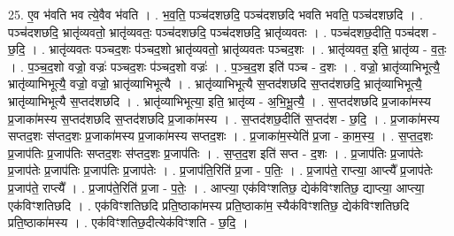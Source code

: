 \documentclass[17pt]{extarticle}
\begin{document}
25. ए॒व भ॑वति भव त्ये॒वैव भ॑वति । . भ॒व॒ति॒ पञ्च॑दशछदि॒ पञ्च॑दशछदि भवति भवति॒ पञ्च॑दशछदि । . पञ्च॑दशछदि॒ भ्रातृ॑व्यवतो॒ भ्रातृ॑व्यवतः॒ पञ्च॑दशछदि॒ पञ्च॑दशछदि॒ भ्रातृ॑व्यवतः । . पञ्च॑दशछ॒दीति॒ पञ्च॑दश - छ॒दि॒ । . भ्रातृ॑व्यवतः पञ्चद॒शः प॑ञ्चद॒शो भ्रातृ॑व्यवतो॒ भ्रातृ॑व्यवतः पञ्चद॒शः । . भ्रातृ॑व्यवत॒ इति॒ भ्रातृ॑व्य - व॒तः॒ । . प॒ञ्च॒द॒शो वज्रो॒ वज्रः॑ पञ्चद॒शः प॑ञ्चद॒शो वज्रः॑ । . प॒ञ्च॒द॒श इति॑ पञ्च - द॒शः । . वज्रो॒ भ्रातृ॑व्याभिभूत्यै॒ भ्रातृ॑व्याभिभूत्यै॒ वज्रो॒ वज्रो॒ भ्रातृ॑व्याभिभूत्यै । . भ्रातृ॑व्याभिभूत्यै स॒प्तद॑शछदि स॒प्तद॑शछदि॒ भ्रातृ॑व्याभिभूत्यै॒ भ्रातृ॑व्याभिभूत्यै स॒प्तद॑शछदि । . भ्रातृ॑व्याभिभूत्या॒ इति॒ भ्रातृ॑व्य - अ॒भि॒भू॒त्यै॒ । . स॒प्तद॑शछदि प्र॒जाका॑मस्य प्र॒जाका॑मस्य स॒प्तद॑शछदि स॒प्तद॑शछदि प्र॒जाका॑मस्य । . स॒प्तद॑शछ॒दीति॑ स॒प्तद॑श - छ॒दि॒ । . प्र॒जाका॑मस्य सप्तद॒शः स॑प्तद॒शः प्र॒जाका॑मस्य प्र॒जाका॑मस्य सप्तद॒शः । . प्र॒जाका॑म॒स्येति॑ प्र॒जा - का॒म॒स्य॒ । . स॒प्त॒द॒शः प्र॒जाप॑तिः प्र॒जाप॑तिः सप्तद॒शः स॑प्तद॒शः प्र॒जाप॑तिः । . स॒प्त॒द॒श इति॑ सप्त - द॒शः । . प्र॒जाप॑तिः प्र॒जाप॑तेः प्र॒जाप॑तेः प्र॒जाप॑तिः प्र॒जाप॑तिः प्र॒जाप॑तेः । . प्र॒जाप॑ति॒रिति॑ प्र॒जा - प॒तिः॒ । . प्र॒जाप॑ते॒ राप्त्या॒ आप्त्यै᳚ प्र॒जाप॑तेः प्र॒जाप॑ते॒ राप्त्यै᳚ । . प्र॒जाप॑ते॒रिति॑ प्र॒जा - प॒तेः॒ । . आप्त्या॒ एक॑विꣳशतिछ॒ द्येक॑विꣳशतिछ॒ द्याप्त्या॒ आप्त्या॒ एक॑विꣳशतिछदि । . एक॑विꣳशतिछदि प्रति॒ष्ठाका॑मस्य प्रति॒ष्ठाका॑म॒ स्यैक॑विꣳशतिछ॒ द्येक॑विꣳशतिछदि प्रति॒ष्ठाका॑मस्य । . एक॑विꣳशतिछ॒दीत्येक॑विꣳशति - छ॒दि॒ । \newline
\end{document}
